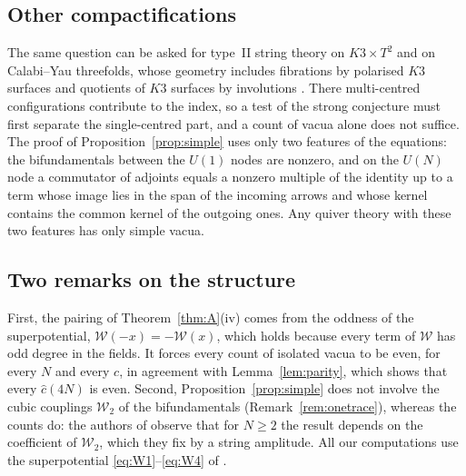 \documentclass[11pt]{amsart}
\theoremstyle{definition}
\newcommand{\cW}{\mathcal W}
\begin{document}
\subsection{Other compactifications}
The same question can be asked for type~II string theory on $K3\times T^2$ and on Calabi--Yau threefolds, whose geometry includes fibrations by polarised $K3$ surfaces and quotients of $K3$ surfaces by involutions \cite{Bha22,BN26}. There multi-centred configurations contribute to the index, so a test of the strong conjecture must first separate the single-centred part, and a count of vacua alone does not suffice. The proof of Proposition~\ref{prop:simple} uses only two features of the equations: the bifundamentals between the $U(1)$ nodes are nonzero, and on the $U(N)$ node a commutator of adjoints equals a nonzero multiple of the identity up to a term whose image lies in the span of the incoming arrows and whose kernel contains the common kernel of the outgoing ones. Any quiver theory with these two features has only simple vacua.

\subsection{Two remarks on the structure}
First, the pairing of Theorem~\ref{thm:A}(iv) comes from the oddness of the superpotential, $\cW(-x)=-\cW(x)$, which holds because every term of $\cW$ has odd degree in the fields. It forces every count of isolated vacua to be even, for every $N$ and every $c$, in agreement with Lemma~\ref{lem:parity}, which shows that every $\hat c(4N)$ is even. Second, Proposition~\ref{prop:simple} does not involve the cubic couplings $\cW_2$ of the bifundamentals (Remark~\ref{rem:onetrace}), whereas the counts do: the authors of \cite{CGMS16} observe that for $N\ge2$ the result depends on the coefficient of $\cW_2$, which they fix by a string amplitude. All our computations use the superpotential \eqref{eq:W1}--\eqref{eq:W4} of \cite{CGMS16}.

\appendix
\end{document}
